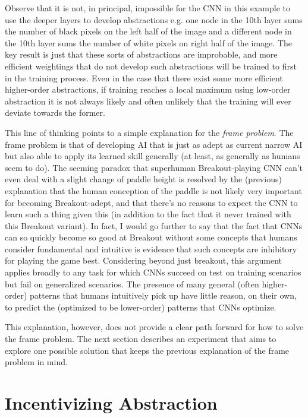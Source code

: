 \documentclass{article}
\renewcommand{\it}{\textit}
\begin{document}
Observe that it is not, in principal, impossible for the CNN in this example to use the deeper layers to develop abstractions e.g. one node in the 10th layer sums the number of black pixels on the left half of the image and a different node in the 10th layer sums the number of white pixels on right half of the image.
The key result is just that these sorts of abstractions are improbable, and more efficient weightings that do not develop such abstractions will be trained to first in the training process.
Even in the case that there exist some more efficient higher-order abstractions, if training reaches a local maximum using low-order abstraction it is not always likely and often unlikely that the training will ever deviate towards the former.

This line of thinking points to a simple explanation for the \it{frame problem}.
The frame problem is that of developing AI that is just as adept as current narrow AI but also able to apply its learned skill generally (at least, as generally as humans seem to do).
The seeming paradox that superhuman Breakout-playing CNN can't even deal with a slight change of paddle height is resolved by the (previous) explanation that the human conception of the paddle is not likely very important for becoming Breakout-adept, and that there's no reasons to expect the CNN to learn such a thing given this (in addition to the fact that it never trained with this Breakout variant).
In fact, I would go further to say that the fact that CNNs can so quickly become so good at Breakout without some concepts that humans consider fundamental and intuitive is evidence that such concepts are inhibitory for playing the game best.
Considering beyond just breakout, this argument applies broadly to any task for which CNNs succeed on test on training scenarios but fail on generalized scenarios.
The presence of many general (often higher-order) patterns that humans intuitively pick up have little reason, on their own, to predict the (optimized to be lower-order) patterns that CNNs optimize.

This explanation, however, does not provide a clear path forward for how to solve the frame problem.
The next section describes an experiment that aims to explore one possible solution that keeps the previous explanation of the frame problem in mind.

\section{Incentivizing Abstraction}
\end{document}
